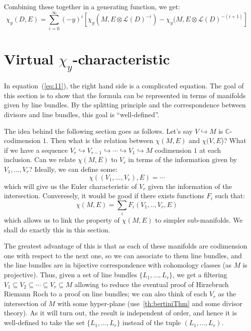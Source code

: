 \documentclass{book}
\newcommand{\C}{{\mathbb{C}}}
\newcommand{\CL}{{\mathcal{L}}}
\newcommand{\sse}{\subseteq}
\begin{document}
Combining these together in a generating function, we get:
\begin{equation}\label{eq:11}
  \chi_y(D, E) = \sum_{i=0}^\infty (-y)^i [\chi_y(M, E\otimes \CL(D)^{-i}) - \chi_y (M, E\otimes
  \CL(D)^{-(i+1)}]
\end{equation}

\section{Virtual $\chi_y$-characteristic}\label{sec:virtualEulerChar}

In equation~(\ref{eq:11}), the right hand side is a complicated equation. The goal of this section is to show
that the formula can be represented in terms of manifolds given by line bundles. By the splitting principle
and the correspondence between divisors and line bundles, this goal is ``well-defined''.

The idea behind the following section goes as follows. Let's say $V \hookrightarrow M$ is $\C$-codimension
$1$. Then what is the relation between $\chi(M, E)$ and $\chi(V, E$)? What if we have a sequence $V_r
\hookrightarrow V_{r-1} \hookrightarrow \cdots \hookrightarrow V_1 \hookrightarrow M$ codimension $1$ at
each inclusion. Can we relate $\chi(M, E)$ to $V_r$ in terms of the information given by $V_1, ..., V_r$? Ideally, we can define some:
\[
  \chi((V_1, ..., V_r), E) = \cdots
\]
which will give us the Euler characteristic of $V_r$ given the information of the intersection. Converesely,
it would be good if there exists functions $F_i$ such that:
\[
  \chi(M, E) = \sum_i F_i(V_1,.., V_r, E)
\]
which allows us to link the property of $\chi(M,E)$ to simpler sub-manifolds. We shall do exactly this in this
section.

The greatest advantage of this is that as each of these manifolds are codimension one with respect to the next
one, so we can associate to them line bundles, and the line bundles are in bijective correspondence with
cohomology classes (as $M$ is projective). Thus, given a set of line bundles $\{L_1, ..., L_r\}$, we get a
filtering $V_1 \sse V_2 \sse \cdots \sse V_r \sse M$ allowing to reduce the eventual proof of Hirzebruch
Riemann Roch to a proof on line bundles; we can also think of each $V_r$ as the intersection of $M$ with some
hyper-plane (use~\cref{th:bertiniThm} and some divisor theory). As it will turn out, the result is independent of order,
and hence it is well-defined to take the set $\{L_1, ..., L_r\}$ instead of the tuple $(L_1, ..., L_r)$.
\end{document}
